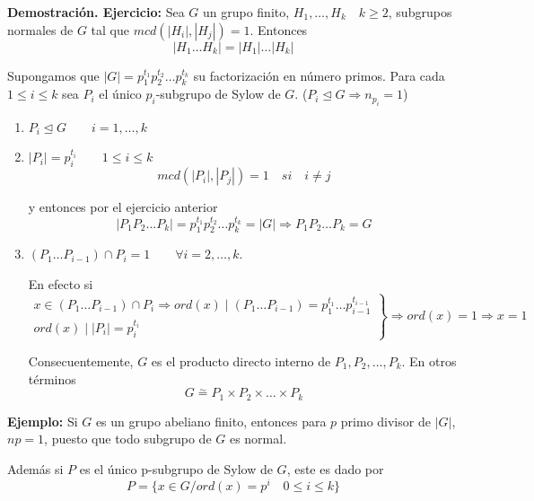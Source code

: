 \documentclass{article}
\begin{document}
\textbf{Demostración. Ejercicio:} Sea $G$ un grupo finito, $H_1,\ldots,H_k\quad k\geq 2$, subgrupos normales de $G$ tal que $mcd(|H_i|,|H_j|)=1$. Entonces
\begin{equation*}
|H_1\ldots H_k|=|H_1|\ldots|H_k|
\end{equation*}

Supongamos que $|G|=p_1^{t_1}p_2^{t_2}\ldots p_k^{t_k}$ su factorización en número primos. Para cada $1\leq i\leq k$ sea $P_i$ el único $p_i$-subgrupo de Sylow de $G$. ($P_i\unlhd G\Rightarrow n_{p_i}=1$)

\begin{enumerate}
\item $P_i\unlhd G\qquad i=1,\ldots,k$

\item $|P_i|=p_i^{t_i}\qquad 1\leq i\leq k$
\begin{equation*}
mcd(|P_i|,|P_j|)=1\quad si\quad i\neq j
\end{equation*}

y entonces por el ejercicio anterior
\begin{equation*}
|P_1P_2\ldots P_k|=p_1^{t_1}p_2^{t_2}\ldots p_k^{t_k}=|G|\Rightarrow P_1P_2\ldots P_k=G
\end{equation*}

\item $(P_1\ldots P_{i-1})\cap P_i=1\qquad \forall i=2,\ldots,k$.

En efecto si 
\begin{equation*}
\left.\begin{array}{c}
x\in (P_1\ldots P_{i-1})\cap P_i\Rightarrow ord(x)\mid (P_1\ldots P_{i-1})=p_1^{t_1}\ldots p_{i-1}^{t_{i-1}} \\
ord(x)\mid |P_i|=p_i^{t_i}
\end{array}\right\rbrace \Rightarrow ord(x)=1\Rightarrow x=1
\end{equation*}

Consecuentemente, $G$ es el producto directo interno de $P_1,P_2,\ldots,P_k$. En otros términos
\begin{equation*}
G\overset{\sim}{=} P_1\times P_2\times \ldots \times P_k
\end{equation*}
\end{enumerate}

\textbf{Ejemplo:} Si $G$ es un grupo abeliano finito, entonces para $p$ primo divisor de $|G|$, $np=1$, puesto que todo subgrupo de $G$ es normal.

Además si $P$ es el único p-subgrupo de Sylow de $G$, este es dado por
\begin{equation*}
P=\{x\in G/ord(x)=p^i\quad 0\leq i\leq k\}
\end{equation*}
\end{document}
